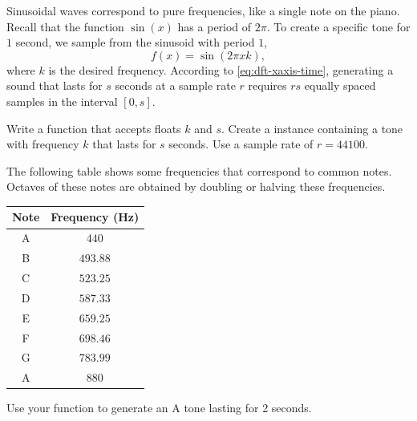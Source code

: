 Sinusoidal waves correspond to pure frequencies, like a single note on the piano.
Recall that the function $\sin(x)$ has a period of $2\pi$.
To create a specific tone for $1$ second, we sample from the sinusoid with period $1$,
\[
f(x) = \sin(2\pi xk),
\]
where $k$ is the desired frequency.
According to \eqref{eq:dft-xaxis-time}, generating a sound that lasts for $s$ seconds at a sample rate $r$ requires $rs$ equally spaced samples in the interval $[0, s]$. %

\begin{problem} %
Write a function that accepts floats $k$ and $s$.
Create a  instance containing a tone with frequency $k$ that lasts for $s$ seconds.
Use a sample rate of $r = 44100$.

The following table shows some frequencies that correspond to common notes.
Octaves of these notes are obtained by doubling or halving these frequencies.
\begin{center}
\begin{tabular}{c|c}
Note & Frequency (Hz) \\
\hline
A & $440$ \\
B & $493.88$ \\
C & $523.25$ \\
D & $587.33$ \\
E & $659.25$ \\
F & $698.46$ \\
G & $783.99$ \\
A & $880$ \\
\end{tabular}
\end{center}
Use your function to generate an A tone lasting for 2 seconds.
\label{prob:generate_note}
\end{problem}

